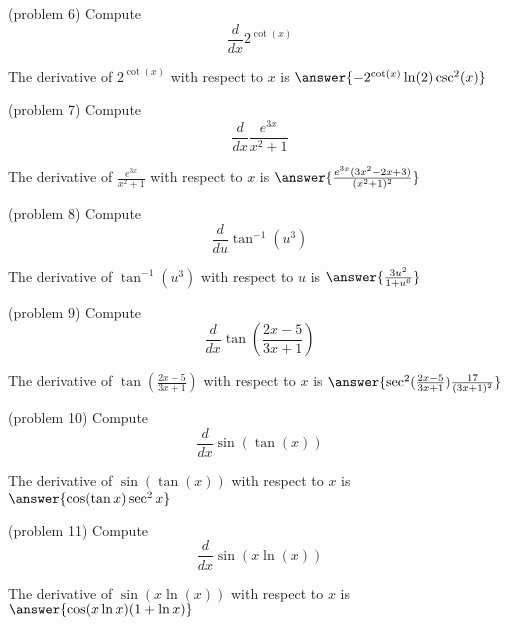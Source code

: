 \documentclass[handout]{ximera}
\begin{document}
\begin{problem}(problem 6)
  Compute
  \[
  \frac{d}{dx} 2^{\cot(x)}
  \]
  
    
    
		The derivative of $2^{\cot(x)}$ with respect to $x$ is
		 $\answer{-2^{\cot(x)}\ln(2)\csc^2(x)}$
		
\end{problem}



\begin{problem}(problem 7)
  Compute
  \[
  \frac{d}{dx} \frac{e^{3x}}{x^2 + 1}
  \]
  
    
		The derivative of $\frac{e^{3x}}{x^2 + 1}$ with respect to $x$ is
		 $\answer{\frac{e^{3x}(3x^2 -2x +3)}{(x^2 + 1)^2}}$
		
\end{problem}



\begin{problem}(problem 8)
  Compute
  \[
  \frac{d}{du} \tan^{-1}(u^3)
  \]
  
    
		The derivative of $\tan^{-1}(u^3)$ with respect to $u$ is
		 $\answer{\frac{3u^2}{1+u^6}}$
		
\end{problem}




\begin{problem}(problem 9)
  Compute
  \[
  \frac{d}{dx} \tan\left(\frac{2x-5}{3x+1}\right)
  \]
  
   
		The derivative of $\tan\left(\frac{2x-5}{3x+1}\right)$ with respect to $x$ is
		 $\answer{\sec^2(\frac{2x-5}{3x+1})\frac{17}{(3x+1)^2}}$
		
\end{problem}


\begin{problem}(problem 10)
  Compute
  \[
  \frac{d}{dx} \sin(\tan (x))
  \]
  
    
		The derivative of $\sin(\tan (x))$ with respect to $x$ is
		 $\answer{\cos(\tan x)\sec^2 x}$
		
\end{problem}



\begin{problem}(problem 11)
  Compute
  \[
  \frac{d}{dx} \sin(x\ln (x))
  \]
  
    
		The derivative of $\sin(x\ln (x))$ with respect to $x$ is
		 $\answer{\cos(x\ln x)(1+\ln x)}$
		
\end{problem}
\end{document}
